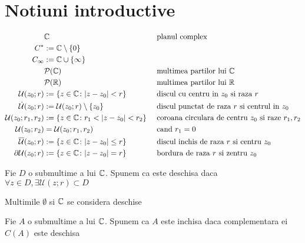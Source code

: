 \section{Notiuni introductive}

\begin{notation}
	\begin{align*}
		&\mathbb{C} && \text{ planul complex} \\
		C^* &:= \mathbb{C} \setminus \{0\}   \\
		C_\infty &:= \mathbb{C}\cup \{\infty\} \\
		&\mathcal{P}(\mathbb{C}) && \text{ multimea partilor lui } \mathbb{C} \\
		&\mathcal{P}(\mathbb{R}) && \text{ multimea partilor lui } \mathbb{R} \\
		\mathcal{U}(z_0;r) &:= \{z \in \mathbb{C} \colon |z - z_0| < r \} 
			&& \text{ discul cu centru in } z_0 \text{ si raza } r \\
		\dot{\mathcal{U}}(z_0;r) &:= \mathcal{U}(z_0;r) \setminus \{z_0\} 
			&& \text{ discul punctat de raza } r \text{ si centrul in } z_0 \\
		\mathcal{U}(z_0;r_1,r_2) &:= \{z \in \mathbb{C} \colon r_1 < |z - z_0| < r_2 \} 
			&& \text{ coroana circulara de centru } z_0 \text { si raze } r_1 , r_2 \\
		\mathcal{U}(z_0;r_2) &= \mathcal{U}(z_0;r_1,r_2) 
			&& \text{ cand } r_1 = 0\\
		\overline{\mathcal{U}}(z_0;r) &:= \{z \in \mathbb{C} \colon |z - z_0| \leq r \} 
			&& \text{ discul inchis de raza } r \text{ si centru } z_0 \\
		\partial\mathcal{U}(z_0;r) &:= \{z \in \mathbb{C} \colon |z - z_0| = r \} 
			&& \text{ bordura de raza } r \text{ si zentru } z_0
	\end{align*}
\end{notation}

\begin{definition}
	Fie $D$ o submultime a lui $\mathbb{C}$.
	Spunem ca este deschisa daca $\forall z \in D, \exists \mathcal{U}(z;r) \subset D$
\end{definition}

\begin{observation}
	Multimile $\emptyset$ si $\mathbb{C}$ se considera deschise
\end{observation}

\begin{definition}
	Fie $A$ o submultime a lui $\mathbb{C}$.
	Spunem ca $A$ este inchisa daca complementara ei $C(A)$ este deschisa
\end{definition}

